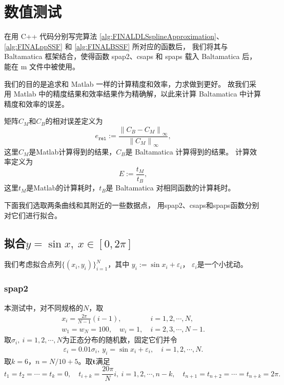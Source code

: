 \cleardoublepage
\section{数值测试}
\label{sec:FINALTest}
在用 C++ 代码分别写完算法 \ref{alg:FINALDLSsplineApproximation}、
\ref{alg:FINALppSSF} 和 \ref{alg:FINALBSSF} 所对应的函数后，
我们将其与 Baltamatica 框架结合，使得函数 spap2、csaps 和 spaps
载入 Baltamatica 后，能在 m 文件中被使用。

我们的目的是追求和 Matlab 一样的计算精度和效率，力求做到更好。
故我们采用 Matlab 中的精度结果和效率结果作为精确解，以此来计算
Baltamatica 中计算精度和效率的误差。

矩阵$C_{M}$和$C_{B}$的相对误差定义为
\begin{equation}
  \label{eq:FINALaccerror}
  e_{\texttt{rel}} := \frac{\left\|C_{B} - C_{M}\right\|_{\infty}}{\left\|C_{M}\right\|_{\infty}},
\end{equation}
这里$C_{M}$是Matlab计算得到的结果，$C_{B}$是 Baltamatica 计算得到的结果。
计算效率定义为
\begin{equation}
  \label{eq:FINALtimeerror}
  E := \frac{t_M}{t_B},
\end{equation}
这里$t_{M}$是Matlab的计算耗时，$t_{B}$是 Baltamatica 对相同函数的计算耗时。

下面我们选取两条曲线和其附近的一些数据点，
用spap2、csaps和spaps函数分别对它们进行拟合。
\subsection{拟合$y=\sin x,\ x\in[0,2\pi]$}
\label{sec:FINALsinx}

我们考虑拟合点列$\{(x_{i},y_{i})\}_{i=1}^{N}$，其中
$y_{i}:=\sin x_{i}+\varepsilon_{i}$，
$\varepsilon_{i}$是一个小扰动。

\subsubsection{spap2}
\label{subsubsec:spap2sinx}
本测试中，对不同规格的$N$，取
\begin{align*}
  x_{i}=\frac{2\pi}{N-1} (i-1),
  \quad &i=1,2,\cdots,N,\\
  w_{1}=w_{N}=100,\quad w_{i}=1, \ &i=2,3,\cdots,N-1.
\end{align*}
取$\sigma_{i},\ i=1,2,\cdots,N$为正态分布的随机数，固定它们并令
\begin{align*}
  \varepsilon_{i}=0.01\sigma_{i},\
  y_{i}=\sin x_{i}+\varepsilon_{i},\quad i=1,2,\cdots,N.
\end{align*}
取$k=6$，$n=N/10+5$。取$\mathbf{t}$满足
\begin{equation*}
  t_{1}=t_{2}=\cdots=t_{k}=0,
  \quad
  t_{i+k}=\frac{20\pi}{N} i,\ i=1,2,\cdots,n-k,
  \quad
  t_{n+1}=t_{n+2}=\cdots=t_{n+k}=2\pi.
\end{equation*}

